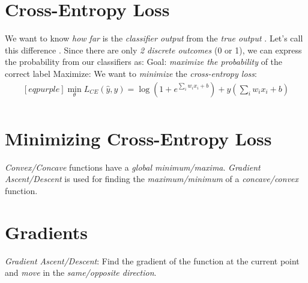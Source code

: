 \documentclass[
	exam={Midterm}
]{cs584exam}
\begin{document}
\section{Cross-Entropy Loss}\label{sec:cross-entropy-loss}
We want to know \emph{how far} is the \emph{classifier output}  from the \emph{true output} .
Let's call this difference .
Since there are only \emph{2 discrete outcomes} (0 or 1), we can express the probability  from our classifiers as:
\data{\[ P(y|x) = \hat{y}^{y}\cdot (1-\hat{y})^{1-y} \]}
Goal: \emph{maximize the probability} of the correct label 
Maximize:
We want to \emph{minimize} the \emph{cross-entropy loss}:
\begin{equation*}
	\begin{aligned}[eqpurple]
		\min_{\theta} L_{CE}(\hat{y}, y) = \log\left( 1 + e^{\sum_{i} w_{i}x_{i} + b} \right) + y\left( \sum_{i} w_{i}x_{i} + b \right)\\
	\end{aligned}
\end{equation*}

\section{Minimizing Cross-Entropy Loss }\label{sec:minimizing-cross-entropy-loss}
\emph{Convex/Concave} functions have a \emph{global minimum/maxima}.
\emph{Gradient Ascent/Descent} is used for finding the \emph{maximum/minimum} of a \emph{concave/convex} function.

\section{Gradients}\label{sec:gradients}
\emph{Gradient Ascent/Descent}: Find the gradient of the function at the current point and \emph{move} in the \emph{same/opposite direction}.
\end{document}
